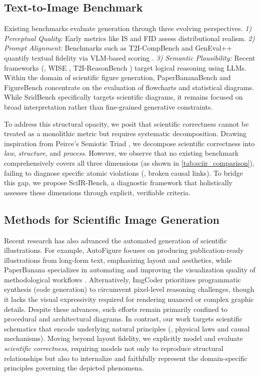 \documentclass[runningheads]{llncs}
\begin{document}
\subsection{Text-to-Image Benchmark}
Existing benchmarks evaluate generation through three evolving perspectives. \textit{1) Perceptual Quality:} Early metrics like IS \cite{salimans2016improved} and FID \cite{heusel2017gans} assess distributional realism. \textit{2) Prompt Alignment:} Benchmarks such as T2I-CompBench \cite{huang2023t2i} and GenEval++ \cite{ye2025echo} quantify textual fidelity via VLM-based scoring \cite{hessel2021clipscore, ghosh2023geneval, hu2023tifa}. \textit{3) Semantic Plausibility:} Recent frameworks (\eg, WISE \cite{niu2025wise}, T2I-ReasonBench \cite{sun2025t2i}) target logical reasoning using LLMs. Within the domain of scientific figure generation, PaperBananaBench \cite{zhu2026paperbanana} and FigureBench \cite{zhu2026autofigure} concentrate on the evaluation of flowcharts and statistical diagrams. While SridBench \cite{chang2025sridbench} specifically targets scientific diagrams, it remains focused on broad interpretation rather than fine-grained generative constraints.

To address this structural opacity, we posit that scientific correctness cannot be treated as a monolithic metric but requires systematic decomposition. Drawing inspiration from Peirce's Semiotic Triad \cite{peirce1931collected}, we decompose scientific correctness into \textit{law}, \textit{structure}, and \textit{process}. However, we observe that no existing benchmark comprehensively covers all three dimensions (as shown in \cref{tab:sciir_comparison}), failing to diagnose specific atomic violations (\eg, broken causal links). To bridge this gap, we propose SciIR-Bench, a diagnostic framework that holistically assesses these dimensions through explicit, verifiable criteria.

\subsection{Methods for Scientific Image Generation}
Recent research has also advanced the automated generation of scientific illustrations. For example, AutoFigure\cite{zhu2026autofigure} focuses on producing publication-ready illustrations from long-form text, emphasizing layout and aesthetics, while PaperBanana specializes in automating and improving the visualization quality of methodological workflows \cite{zhu2026paperbanana}. Alternatively, ImgCoder\cite{lin2026scientific} prioritizes programmatic synthesis (code generation) to circumvent pixel-level reasoning challenges, though it lacks the visual expressivity required for rendering nuanced or complex graphic details. Despite these advances, such efforts remain primarily confined to procedural and architectural diagrams. In contrast, our work targets scientific schematics that encode underlying natural principles (\eg, physical laws and causal mechanisms). Moving beyond layout fidelity, we explicitly model and evaluate \emph{scientific correctness}, requiring models not only to reproduce structural relationships but also to internalize and faithfully represent the domain-specific principles governing the depicted phenomena.
\end{document}
